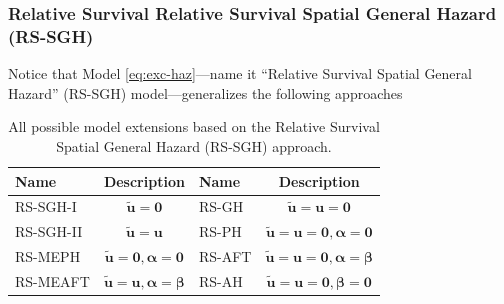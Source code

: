 \documentclass[10pt, aspectratio = 169, handout]{beamer} %
\begin{document}
     \begin{frame}[t]
        \frametitle{Relative Survival Relative Survival Spatial General Hazard (RS-SGH)}
        \justifying
        
        Notice that \textcolor{titles}{Model \eqref{eq:exc-haz}}---name it ``Relative Survival Spatial General Hazard'' (RS-SGH) model---generalizes the following approaches

        \begin{table}[]
                \caption{\justifying All possible model extensions based on the Relative Survival Spatial General Hazard (RS-SGH) approach.}
                \label{tab:models-surv}
                \begin{tabular}{l | c | l | c }
                Name & Description & Name & Description  \\ \hline 
                RS-SGH-I &  $\tilde{\mathbf{u}} = \mathbf{0}$& RS-GH & $\tilde{\mathbf{u}} = \mathbf{u} = \mathbf{0}$ \\
                RS-SGH-II &  $\tilde{\mathbf{u}} = \mathbf{u}$& RS-PH & $\tilde{\mathbf{u}} = \mathbf{u} = \mathbf{0}, \boldsymbol{\alpha} = \mathbf{0}$ \\
                RS-MEPH &  $\tilde{\mathbf{u}} = \mathbf{0}, \boldsymbol{\alpha} = \mathbf{0}$& RS-AFT & $\tilde{\mathbf{u}} = \mathbf{u} = \mathbf{0}, \boldsymbol{\alpha} = \boldsymbol{\beta}$ \\
                RS-MEAFT &  $\tilde{\mathbf{u}} = \mathbf{u}, \boldsymbol{\alpha} = \boldsymbol{\beta}$& RS-AH&  $\tilde{\mathbf{u}} = \mathbf{u} = \mathbf{0}, \boldsymbol{\beta} = \mathbf{0}$ \\
                \end{tabular}%
        \end{table}

    \end{frame}
\end{document}
